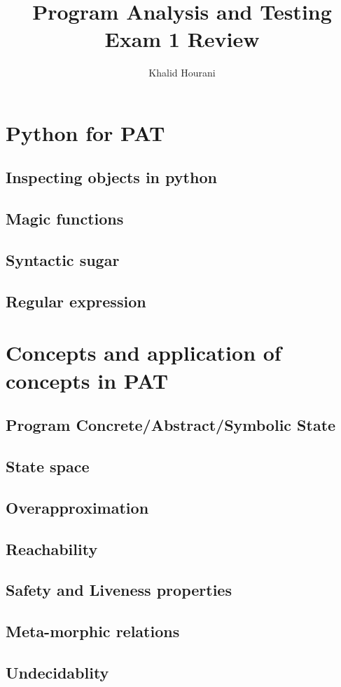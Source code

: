 \documentclass{article}
\title{Program Analysis and Testing\\Exam 1 Review}
\author{Khalid Hourani}
\begin{document}
\maketitle
\section{Python for PAT} 
\subsection{Inspecting objects in python}
\subsection{Magic functions}
\subsection{Syntactic sugar}
\subsection{Regular expression}

\section{Concepts and application of concepts in PAT} 
\subsection{Program Concrete/Abstract/Symbolic State} 
\subsection{State space} 
\subsection{Overapproximation} 
\subsection{Reachability} 
\subsection{Safety and Liveness properties} 
\subsection{Meta-morphic relations} 
\subsection{Undecidablity} 
\end{document}
